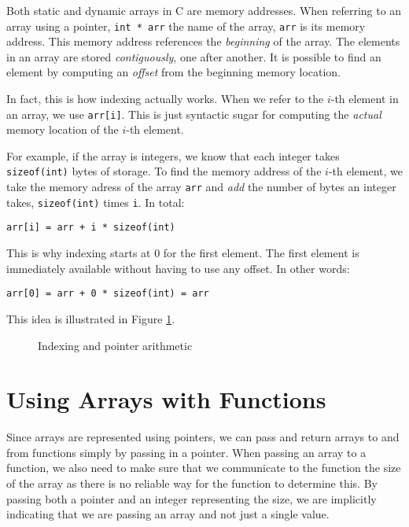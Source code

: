 Both static and dynamic arrays in C are memory addresses.  When referring
to an array using a pointer, \texttt{int * arr} the name of
the array, \texttt{arr} is its memory address.  This memory
address references the \emph{beginning} of the array.  The elements
in an array are stored \emph{contiguously}, one after another.  
It is possible to find an element by computing an \emph{offset} from
the beginning memory location.  

In fact, this is how indexing actually works.  When we refer to the
$i$-th element in an array, we use \texttt{arr[i]}.  This is
just syntactic sugar for computing the \emph{actual} memory location
of the $i$-th element.  

For example, if the array is integers, we know that each integer
takes \texttt{sizeof(int)} bytes of storage.  To find the
memory address of the $i$-th element, we take the memory adress
of the array \texttt{arr} and \emph{add} the number of
bytes an integer takes, \texttt{sizeof(int)} times 
\texttt{i}.  In total:

\texttt{arr[i] = arr + i * sizeof(int)} 

This is why indexing starts at 0 for the first element.  The
first element is immediately available without having to 
use any offset.  In other words: 

\texttt{arr[0] = arr + 0 * sizeof(int) = arr}

This idea is illustrated in Figure \ref{figure:indexingPointerArithmetic}.

\begin{figure}
\centering

\caption{Indexing and pointer arithmetic}
\label{figure:indexingPointerArithmetic}
\end{figure}

\section{Using Arrays with Functions}

Since arrays are represented using pointers, we can pass and
return arrays to and from functions simply by passing in a pointer.
When passing an array to a function, we also need to make sure
that we communicate to the function the size of the array as there
is no reliable way for the function to determine this.  By passing
both a pointer and an integer representing the size, we are implicitly
indicating that we are passing an array and not just a single value.

